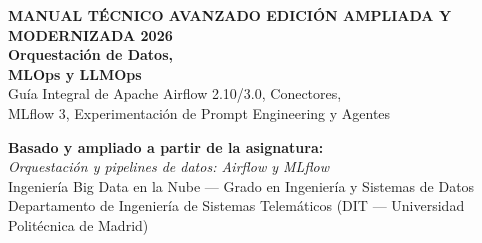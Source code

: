 \begin{titlepage}
\vspace*{0.6cm}
\noindent\hspace*{0.2cm}\begin{minipage}{0.95\textwidth}
  {\sffamily\bfseries\footnotesize\color{TealAccent!45!white}\MakeUppercase{Manual Técnico Avanzado \textbullet{} Edición Ampliada y Modernizada 2026}}\\[1.0cm]
  {\sffamily\bfseries\fontsize{28}{33}\selectfont\color{white}Orquestación de Datos,\\[4pt]MLOps y LLMOps}\\[0.55cm]
  {\sffamily\fontsize{14.5}{19}\selectfont\color{white!88!PrimaryAccent}Guía Integral de Apache Airflow 2.10/3.0, Conectores,\\[2pt]MLflow 3, Experimentación de Prompt Engineering y Agentes}
\end{minipage}

\vspace*{1.95cm}

\noindent\hspace*{0.2cm}\begin{minipage}{0.94\textwidth}
  {\sffamily\bfseries\large\color{PrimaryDark}Basado y ampliado a partir de la asignatura:}\\[4pt]
  {\sffamily\normalsize\color{PrimaryAccent}\textit{Orquestación y pipelines de datos: Airflow y MLflow}}\\
  {\small\color{MutedGray}Ingeniería Big Data en la Nube --- Grado en Ingeniería y Sistemas de Datos\\
  Departamento de Ingeniería de Sistemas Telemáticos (DIT --- Universidad Politécnica de Madrid)}

  \vspace{0.65cm}


\end{minipage}
\end{titlepage}
